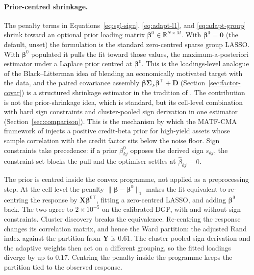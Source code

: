 \documentclass[article]{jss}
\begin{document}
\paragraph{Prior-centred shrinkage.}
The penalty terms in Equations~\ref{eq:sgl-sign}, \ref{eq:adapt-l1}, and
\ref{eq:adapt-group} shrink toward an optional prior loading matrix
$\bm{\beta}^{0} \in \mathbb{R}^{N \times M}$. With $\bm{\beta}^{0} =
\bm{0}$ (the default,  unset) the formulation is
the standard zero-centred sparse group LASSO. With $\bm{\beta}^0$
populated it pulls the fit toward those values, the
maximum-a-posteriori estimator under a Laplace prior centred at
$\bm{\beta}^0$. This is the loadings-level analogue of the
Black--Litterman idea \citep{Black+Litterman:1992} of blending an
economically motivated target with the data, and the paired covariance
assembly $\bm{\beta} \bm{\Sigma}_F \bm{\beta}^\top + \bm{D}$
(Section~\ref{sec:factor-covar}) is a structured shrinkage estimator in
the tradition of \cite{Ledoit+Wolf:2004}. The contribution is not the
prior-shrinkage idea, which is standard, but its cell-level combination
with hard sign constraints and cluster-pooled sign derivation in one
estimator (Section~\ref{sec:comparison}). This is the mechanism by which
the MATF-CMA framework of \cite{Sepp+Hansen+Kastenholz:2026MATF} injects
a positive credit-beta prior for high-yield assets whose sample
correlation with the credit factor sits below the noise floor. Sign
constraints take precedence: if a prior $\beta^{0}_{kj}$ opposes the
derived sign $s_{kj}$, the constraint set blocks the pull and the
optimiser settles at $\hat{\beta}_{kj} = 0$.

The prior is centred inside the convex programme, not applied as a
preprocessing step. At the cell level the penalty $\|\bm{\beta} - \bm{\beta}^0\|_1$
makes the fit equivalent to re-centring the response by $\bm{X}\bm{\beta}^{0\top}$,
fitting a zero-centred LASSO, and adding $\bm{\beta}^0$ back. The two agree to
$2 \times 10^{-5}$ on the calibrated DGP, with and without sign constraints.
Cluster discovery breaks the equivalence. Re-centring the response changes its
correlation matrix, and hence the Ward partition: the adjusted Rand index
against the partition from $\bm{Y}$ is $0.61$. The cluster-pooled sign
derivation and the adaptive weights then act on a different grouping, so the
fitted loadings diverge by up to $0.17$. Centring the penalty inside the
programme keeps the partition tied to the observed response.
\end{document}
